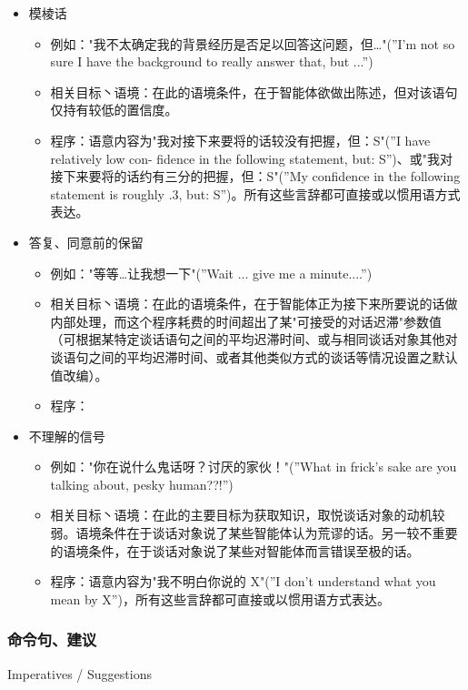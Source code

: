 \begin{itemize}
\item 模棱话
\begin{itemize}
\item 例如："我不太确定我的背景经历是否足以回答这问题，但…"(”I’m not so sure I have the background to really answer that, but ...”)
\item 相关目标丶语境：在此的语境条件，在于智能体欲做出陈述，但对该语句仅持有较低的置信度。
\item 程序：语意内容为"我对接下来要将的话较没有把握，但：S"(”I have relatively low con- fidence in the following statement, but: S”)、或"我对接下来要将的话约有三分的把握，但：S"(”My confidence in the following statement is roughly .3, but: S”)。所有这些言辞都可直接或以惯用语方式表达。
\end{itemize}
\item 答复、同意前的保留
\begin{itemize}
\item 例如："等等…让我想一下"(”Wait ... give me a minute....”)
\item 相关目标丶语境：在此的语境条件，在于智能体正为接下来所要说的话做内部处理，而这个程序耗费的时间超出了某"可接受的对话迟滞"参数值（可根据某特定谈话语句之间的平均迟滞时间、或与相同谈话对象其他对谈语句之间的平均迟滞时间、或者其他类似方式的谈话等情况设置之默认值改编）。 
\item 程序：
\end{itemize}


\item 不理解的信号
\begin{itemize}
\item 例如："你在说什么鬼话呀？讨厌的家伙！"(”What in frick’s sake are you talking about, pesky human??!”)
\item 相关目标丶语境：在此的主要目标为获取知识，取悦谈话对象的动机较弱。语境条件在于谈话对象说了某些智能体认为荒谬的话。另一较不重要的语境条件，在于谈话对象说了某些对智能体而言错误至极的话。
\item 程序：语意内容为"我不明白你说的 X"(”I don’t understand what you mean by X”)，所有这些言辞都可直接或以惯用语方式表达。
\end{itemize}

\end{itemize}

\subsubsection{命令句、建议}{Imperatives / Suggestions}

